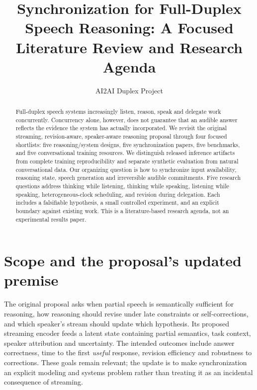 \documentclass{article}
\title{Synchronization for Full-Duplex Speech Reasoning: A Focused Literature Review and Research Agenda}
\author{AI2AI Duplex Project}
\begin{document}
\maketitle
\rhead{}
\cfoot{\thepage}
\raggedbottom

\begin{abstract}
Full-duplex speech systems increasingly listen, reason, speak and delegate work concurrently. Concurrency alone, however, does not guarantee that an audible answer reflects the evidence the system has actually incorporated. We revisit the original streaming, revision-aware, speaker-aware reasoning proposal through four focused shortlists: five reasoning/system designs, five synchronization papers, five benchmarks, and five conversational training resources. We distinguish released inference artifacts from complete training reproducibility and separate synthetic evaluation from natural conversational data. Our organizing question is how to synchronize input availability, reasoning state, speech generation and irreversible audible commitments. Five research questions address thinking while listening, thinking while speaking, listening while speaking, heterogeneous-clock scheduling, and revision during delegation. Each includes a falsifiable hypothesis, a small controlled experiment, and an explicit boundary against existing work. This is a literature-based research agenda, not an experimental results paper.
\end{abstract}

\section{Scope and the proposal's updated premise}
\label{sec:scope}
The original proposal asks when partial speech is semantically sufficient for reasoning, how reasoning should revise under late constraints or self-corrections, and which speaker's stream should update which hypothesis. Its proposed streaming encoder feeds a latent state containing partial semantics, task context, speaker attribution and uncertainty. The intended outcomes include answer correctness, time to the first \emph{useful} response, revision efficiency and robustness to corrections. These goals remain relevant; the update is to make synchronization an explicit modeling and systems problem rather than treating it as an incidental consequence of streaming.
\end{document}
